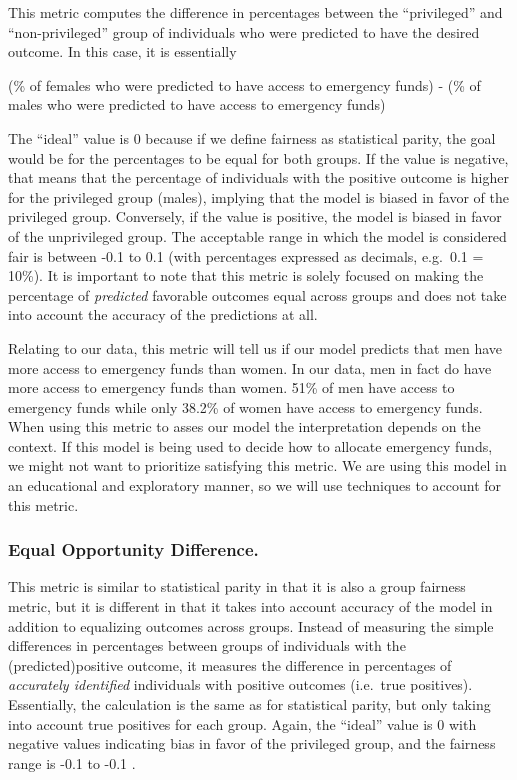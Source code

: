 \documentclass[water,article,submit,moreauthors,pdftex]{mdpi}
\begin{document}
This metric computes the difference in percentages between the
``privileged'' and ``non-privileged'' group of individuals who were
predicted to have the desired outcome. In this case, it is essentially

(\% of females who were predicted to have access to emergency funds) -
(\% of males who were predicted to have access to emergency funds)

The ``ideal'' value is 0 because if we define fairness as statistical
parity, the goal would be for the percentages to be equal for both
groups. If the value is negative, that means that the percentage of
individuals with the positive outcome is higher for the privileged group
(males), implying that the model is biased in favor of the privileged
group. Conversely, if the value is positive, the model is biased in
favor of the unprivileged group. The acceptable range in which the model
is considered fair is between -0.1 to 0.1 (with percentages expressed as
decimals, e.g.~0.1 = 10\%). It is important to note that this metric is
solely focused on making the percentage of \emph{predicted} favorable
outcomes equal across groups and does not take into account the accuracy
of the predictions at all.\citep{caton2020fairness, kypraiou_what_2021}

Relating to our data, this metric will tell us if our model predicts
that men have more access to emergency funds than women. In our data,
men in fact do have more access to emergency funds than women. 51\% of
men have access to emergency funds while only 38.2\% of women have
access to emergency funds. When using this metric to asses our model the
interpretation depends on the context. If this model is being used to
decide how to allocate emergency funds, we might not want to prioritize
satisfying this metric. We are using this model in an educational and
exploratory manner, so we will use techniques to account for this
metric.

\hypertarget{equal-opportunity-difference.}{%
\subsubsection{Equal Opportunity
Difference.}\label{equal-opportunity-difference.}}

This metric is similar to statistical parity in that it is also a group
fairness metric, but it is different in that it takes into account
accuracy of the model in addition to equalizing outcomes across groups.
Instead of measuring the simple differences in percentages between
groups of individuals with the (predicted)positive outcome, it measures
the difference in percentages of \emph{accurately identified}
individuals with positive outcomes (i.e.~true positives). Essentially,
the calculation is the same as for statistical parity, but only taking
into account true positives for each group. Again, the ``ideal'' value
is 0 with negative values indicating bias in favor of the privileged
group, and the fairness range is -0.1 to -0.1 \citep{caton2020fairness}.
\end{document}
